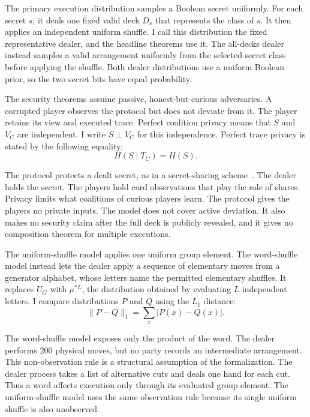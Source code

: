 \documentclass[runningheads]{llncs}
\begin{document}
The primary execution distribution samples a Boolean secret uniformly. For
each secret $s$, it deals one fixed valid deck $D_s$ that represents the class
of $s$. It then applies an independent uniform shuffle. I call this
distribution the fixed representative dealer, and the headline theorems use
it. The all-decks dealer instead samples a valid arrangement uniformly from
the selected secret class before applying the shuffle. Both dealer
distributions use a uniform Boolean prior, so the two secret bits have equal
probability.

The security theorems assume passive, honest-but-curious adversaries. A
corrupted player observes the protocol but does not deviate from it. The
player retains its view and executed trace. Perfect coalition privacy means
that $S$ and $V_C$ are independent. I write
$S\mathrel{\perp}V_C$ for this independence. Perfect trace privacy is stated
by the following equality:
\begin{equation}
  H(S\mid T_C)=H(S).
  \label{eq:trace-privacy}
\end{equation}

The protocol protects a dealt secret, as in a secret-sharing
scheme~\cite{Shamir1979}. The dealer holds the secret. The players hold card
observations that play the role of shares. Privacy limits what coalitions of
curious players learn. The protocol gives the players no private inputs. The
model does not cover active deviation. It also makes no security claim after
the full deck is publicly revealed, and it gives no composition theorem for
multiple executions.

The uniform-shuffle model applies one uniform group element. The word-shuffle
model instead lets the dealer apply a sequence of elementary moves from a
generator alphabet, whose letters name the permitted elementary shuffles. It
replaces $U_G$ with $\mu^{*L}$, the distribution obtained by evaluating $L$
independent letters. I compare distributions $P$ and $Q$ using the $L_1$
distance:
\begin{equation}
  \lVert P-Q\rVert_1=\sum_x\lvert P(x)-Q(x)\rvert.
  \label{eq:l1-definition}
\end{equation}

The word-shuffle model exposes only the product of the word. The dealer
performs 200 physical moves, but no party records an intermediate arrangement.
This non-observation rule is a structural assumption of the formalization. The
dealer process takes a list of alternative cuts and deals one hand for each
cut. Thus a word affects execution only through its evaluated group element.
The uniform-shuffle model uses the same observation rule because its single
uniform shuffle is also unobserved.
\end{document}
